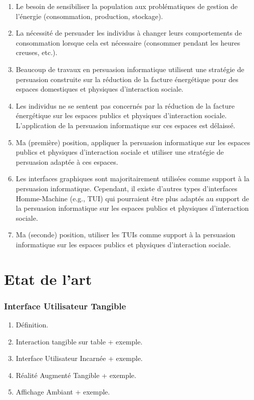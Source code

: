 \documentclass[]{pandoc/sigchi}
\begin{document}
\begin{enumerate}
\def\labelenumi{\arabic{enumi}.}
\itemsep1pt\parskip0pt
\item
  Le besoin de sensibiliser la population aux problématiques de gestion
  de l'énergie (consommation, production, stockage).
\item
  La nécessité de persuader les individus à changer leurs comportements
  de consommation lorsque cela est nécessaire (consommer pendant les
  heures creuses, etc.).
\item
  Beaucoup de travaux en persuasion informatique utilisent une stratégie
  de persuasion construite sur la réduction de la facture énergétique
  pour des espaces domestiques et physiques d'interaction sociale.
\item
  Les individus ne se sentent pas concernés par la réduction de la
  facture énergétique sur les espaces publics et physiques d'interaction
  sociale. L'application de la persuasion informatique sur ces espaces
  est délaissé.
\item
  Ma (première) position, appliquer la persuasion informatique sur les
  espaces publics et physiques d'interaction sociale et utiliser une
  stratégie de persuasion adaptée à ces espaces.
\item
  Les interfaces graphiques sont majoritairement utilisées comme support
  à la persuasion informatique. Cependant, il existe d'autres types
  d'interfaces Homme-Machine (e.g., TUI) qui pourraient être plus
  adaptés au support de la persuasion informatique sur les espaces
  publics et physiques d'interaction sociale.
\item
  Ma (seconde) position, utiliser les TUIs comme support à la persuasion
  informatique sur les espaces publics et physiques d'interaction
  sociale.
\end{enumerate}

\section{Etat de l'art}\label{etat-de-lart}

\subsubsection{Interface Utilisateur
Tangible}\label{interface-utilisateur-tangible}

\begin{enumerate}
\def\labelenumi{\arabic{enumi}.}
\itemsep1pt\parskip0pt
\item
  Définition.
\item
  Interaction tangible sur table + exemple.
\item
  Interface Utilisateur Incarnée + exemple.
\item
  Réalité Augmenté Tangible + exemple.
\item
  Affichage Ambiant + exemple.
\end{enumerate}
\end{document}
